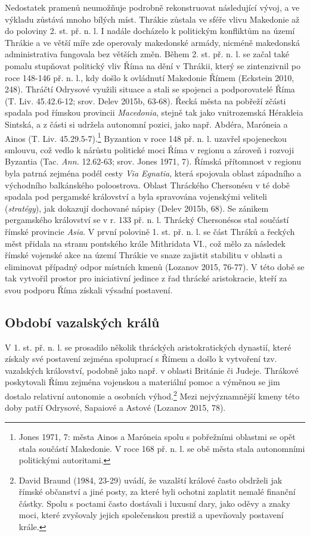 Nedostatek pramenů neumožňuje podrobně rekonstruovat následující vývoj, a ve výkladu zůstává mnoho bílých míst. Thrákie zůstala ve sféře vlivu Makedonie až do poloviny 2. st. př. n. l. I nadále docházelo k politickým konfliktům na území Thrákie a ve větší míře zde operovaly makedonské armády, nicméně makedonská administrativa fungovala bez větších změn. Během 2. st. př. n. l. se začal také pomalu stupňovat politický vliv Říma na dění v Thrákii, který se zintenzivnil po roce 148-146 př. n. l., kdy došlo k ovládnutí Makedonie Římem (Eckstein 2010, 248). Thráčtí Odrysové využili situace a stali se spojenci a podporovatelé Říma (T. Liv. 45.42.6-12; srov. Delev 2015b, 63-68). Řecká města na pobřeží zčásti spadala pod římskou provincii {\em Macedonia}, stejně tak jako vnitrozemská Hérakleia Sintská, a z části si udržela autonomní pozici, jako např. Abdéra, Maróneia a Ainos (T. Liv. 45.29.5-7).\footnote{Jones 1971, 7: města Ainos a Maróneia spolu s pobřežními oblastmi se opět stala součástí Makedonie. V roce 168 př. n. l. se obě města stala autonomními politickými autoritami.} Byzantion v roce 148 př. n. l. uzavřel spojeneckou smlouvu, což vedlo k nárůstu politické moci Říma v regionu a zároveň i rozvoji Byzantia (Tac. {\em Ann.} 12.62-63; srov. Jones 1971, 7). Římská přítomnost v regionu byla patrná zejména podél cesty {\em Via Egnatia}, která spojovala oblast západního a východního balkánského poloostrova. Oblast Thráckého Chersonésu v té době spadala pod pergamské království a byla spravována vojenskými veliteli ({\em stratégy}), jak dokazují dochované nápisy (Delev 2015b, 68). Se zánikem pergamského království se v r. 133 př. n. l. Thrácký Chersonésos stal součástí římské provincie {\em Asia}. V první polovině 1. st. př. n. l. se část Thráků a řeckých měst přidala na stranu pontského krále Mithridata VI., což mělo za následek římské vojenské akce na území Thrákie ve snaze zajistit stabilitu v oblasti a eliminovat případný odpor místních kmenů (Lozanov 2015, 76-77). V této době se tak vytvořil prostor pro iniciativní jedince z řad thrácké aristokracie, kteří za svou podporu Říma získali výsadní postavení.

\subsection[období-vazalských-králů]{Období vazalských králů}

V 1. st. př. n. l. se prosadilo několik thráckých aristokratických dynastií, které získaly své postavení zejména spoluprací s Římem a došlo k vytvoření tzv. vazalských království, podobně jako např. v oblasti Británie či Judeje. Thrákové poskytovali Římu zejména vojenskou a materiální pomoc a výměnou se jim dostalo relativní autonomie a osobních výhod.\footnote{David Braund (1984, 23-29) uvádí, že vazalští králové často obdrželi jak římské občanství a jiné posty, za které byli ochotni zaplatit nemalé finanční částky. Spolu s poctami často dostávali i luxusní dary, jako oděvy a znaky moci, které zvyšovaly jejich společenskou prestiž a upevňovaly postavení krále.} Mezi nejvýznamnější kmeny této doby patří Odrysové, Sapaiové a Astové (Lozanov 2015, 78).

